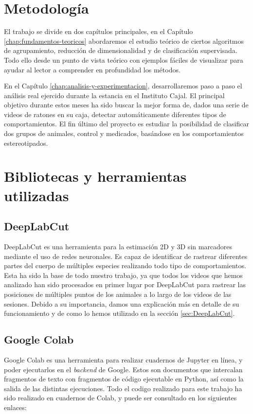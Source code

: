 \section{Metodología} \label{sec:metodología}

El trabajo se divide en dos capítulos principales, en el Capítulo \ref{chap:fundamentos-teoricos} abordaremos el estudio teórico de ciertos algoritmos de agrupamiento, reducción de dimensionalidad y de clasificación supervisada. Todo ello desde un punto de vista teórico con ejemplos fáciles de visualizar para ayudar al lector a comprender en profundidad los métodos.

En el Capítulo \ref{chap:analisis-y-experimentacion}, desarrollaremos paso a paso el análisis real ejercido durante la estancia en el Instituto Cajal. El principal objetivo durante estos meses ha sido buscar la mejor forma de, dados una serie de videos de ratones en su caja, detectar automáticamente diferentes tipos de comportamientos. El fin último del proyecto es estudiar la posibilidad de clasificar dos grupos de animales, control y medicados, basándose en los comportamientos estereotipados.

\section{Bibliotecas y herramientas utilizadas} \label{sec:herramientas}

\subsection*{DeepLabCut}
DeepLabCut \cite{deeplabcut} es una herramienta para la estimación 2D y 3D sin marcadores mediante el uso de redes neuronales. Es capaz de identificar de rastrear diferentes partes del cuerpo de múltiples especies realizando todo tipo de comportamientos. Esta ha sido la base de todo nuestro trabajo, ya que todos los videos que hemos analizado han sido procesados en primer lugar por DeepLabCut para rastrear las posiciones de múltiples puntos de los animales a lo largo de los videos de las sesiones. Debido a su importancia, damos una explicación más en detalle de su funcionamiento y de como lo hemos utilizado en la sección \ref{sec:DeepLabCut}.

\subsection*{Google Colab}
Google Colab es una herramienta para realizar cuadernos de Jupyter en línea, y poder ejecutarlos en el \textit{backend} de Google. Estos son documentos que intercalan fragmentos de texto con fragmentos de código ejecutable en Python, así como la salida de las distintas ejecuciones. Todo el codigo realizado para este trabajo ha sido realizado en cuadernos de Colab, y puede ser consultado en los siguientes enlaces:

